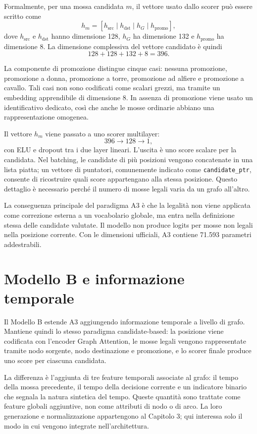Formalmente, per una mossa candidata \(m\), il vettore usato dallo scorer pu\`o essere scritto come
\[
    h_m =
    [h_{\mathrm{src}} \mid h_{\mathrm{dst}} \mid h_G \mid h_{\mathrm{promo}}],
\]
dove \(h_{\mathrm{src}}\) e \(h_{\mathrm{dst}}\) hanno dimensione 128, \(h_G\) ha dimensione 132 e \(h_{\mathrm{promo}}\) ha dimensione 8. La dimensione complessiva del vettore candidato \`e quindi
\[
    128 + 128 + 132 + 8 = 396.
\]

La componente di promozione distingue cinque casi: nessuna promozione, promozione a donna, promozione a torre, promozione ad alfiere e promozione a cavallo. Tali casi non sono codificati come scalari grezzi, ma tramite un embedding apprendibile di dimensione 8. In assenza di promozione viene usato un identificativo dedicato, cos\`i che anche le mosse ordinarie abbiano una rappresentazione omogenea.

Il vettore \(h_m\) viene passato a uno scorer multilayer:
\[
    396 \rightarrow 128 \rightarrow 1,
\]
con ELU e dropout tra i due layer lineari. L'uscita \`e uno score scalare per la candidata. Nel batching, le candidate di pi\`u posizioni vengono concatenate in una lista piatta; un vettore di puntatori, comunemente indicato come \texttt{candidate\_ptr}, consente di ricostruire quali score appartengano alla stessa posizione. Questo dettaglio \`e necessario perch\'e il numero di mosse legali varia da un grafo all'altro.

La conseguenza principale del paradigma A3 \`e che la legalit\`a non viene applicata come correzione esterna a un vocabolario globale, ma entra nella definizione stessa delle candidate valutate. Il modello non produce logits per mosse non legali nella posizione corrente. Con le dimensioni ufficiali, A3 contiene 71.593 parametri addestrabili.

\section{Modello B e informazione temporale}

Il Modello B estende A3 aggiungendo informazione temporale a livello di grafo. Mantiene quindi lo stesso paradigma candidate-based: la posizione viene codificata con l'encoder Graph Attention, le mosse legali vengono rappresentate tramite nodo sorgente, nodo destinazione e promozione, e lo scorer finale produce uno score per ciascuna candidata.

La differenza \`e l'aggiunta di tre feature temporali associate al grafo: il tempo della mossa precedente, il tempo della decisione corrente e un indicatore binario che segnala la natura sintetica del tempo. Queste quantit\`a sono trattate come feature globali aggiuntive, non come attributi di nodo o di arco. La loro generazione e normalizzazione appartengono al Capitolo 3; qui interessa solo il modo in cui vengono integrate nell'architettura.

